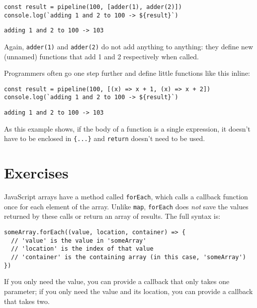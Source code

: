 \begin{verbatim}
const result = pipeline(100, [adder(1), adder(2)])
console.log(`adding 1 and 2 to 100 -> ${result}`)
\end{verbatim}

\begin{verbatim}
adding 1 and 2 to 100 -> 103
\end{verbatim}

Again, \texttt{adder(1)} and \texttt{adder(2)} do not add anything to anything:
they define new (unnamed) functions that add 1 and 2 respectively when called.

Programmers often go one step further and define little functions like this inline:

\begin{verbatim}
const result = pipeline(100, [(x) => x + 1, (x) => x + 2])
console.log(`adding 1 and 2 to 100 -> ${result}`)
\end{verbatim}

\begin{verbatim}
adding 1 and 2 to 100 -> 103
\end{verbatim}

As this example shows,
if the body of a function is a single expression,
it doesn't have to be enclosed in \texttt{\{...\}} and \texttt{return} doesn't need to be used.

\section{Exercises}\label{s:callbacks-exercises}


JavaScript arrays have a method called \texttt{forEach},
which calls a callback function once for each element of the array.
Unlike \texttt{map},
\texttt{forEach} does \emph{not} save the values returned by these calls
or return an array of results.
The full syntax is:

\begin{verbatim}
someArray.forEach((value, location, container) => {
  // 'value' is the value in 'someArray'
  // 'location' is the index of that value
  // 'container' is the containing array (in this case, 'someArray')
})
\end{verbatim}

If you only need the value,
you can provide a callback that only takes one parameter;
if you only need the value and its location,
you can provide a callback that takes two.

